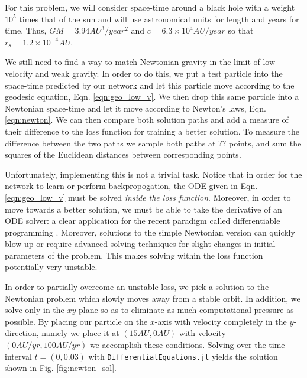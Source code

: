 \documentclass{CUP-JNL-DTM}%
\theoremstyle{definition}
\numberwithin{equation}{section}
\begin{document}
For this problem, we will consider space-time around a black hole with a weight $10^5$ times that of the sun and will use astronomical units for length and years for time. Thus, $GM = 3.94\si{AU^{3}/year^2}$ and $c = 6.3 \times 10^4 \si{AU/year}$ so that $r_s = 1.2 \times 10^{-4} \si{AU}$. 

We still need to find a way to match Newtonian gravity in the limit of low velocity and weak gravity. In order to do this, we put a test particle into the space-time predicted by our network and let this particle move according to the geodesic equation, Eqn. \ref{eqn:geo_low_v}. We then drop this same particle into a Newtonian space-time and let it move according to Newton's laws, Eqn. \ref{eqn:newton}. We can then compare both solution paths and add a measure of their difference to the loss function for training a better solution. To measure the difference between the two paths we sample both paths at ?? points, and sum the squares of the Euclidean distances between corresponding points.

Unfortunately, implementing this is not a trivial task. Notice that in order for the network to learn or perform backpropogation, the ODE given in Eqn. \ref{eqn:geo_low_v} must be solved \emph{inside the loss function}. Moreover, in order to move towards a better solution, we must be able to take the derivative of an ODE solver: a clear application for the recent paradigm called differentiable programming \cite{innesDifferentiableProgrammingSystem2019,baydinAutomaticDifferentiationMachine2018}. Moreover, solutions to the simple Newtonian version can quickly blow-up or require advanced solving techniques for slight changes in initial parameters of the problem. This makes solving within the loss function potentially very unstable. 

In order to partially overcome an unstable loss, we pick a solution to the Newtonian problem which slowly moves away from a stable orbit. In addition, we solve only in the $xy$-plane so as to eliminate as much computational pressure as possible. By placing our particle on the $x$-axis with velocity completely in the $y$-direction, namely we place it at $(15 \si{AU}, 0 \si{AU})$ with velocity $(0 \si{AU/yr}, 100 \si{AU/yr})$ we accomplish these conditions. Solving over the time interval $t = (0, 0.03)$ with \texttt{DifferentialEquations.jl} yields the solution shown in Fig. \ref{fig:newton_sol}. 
\end{document}

